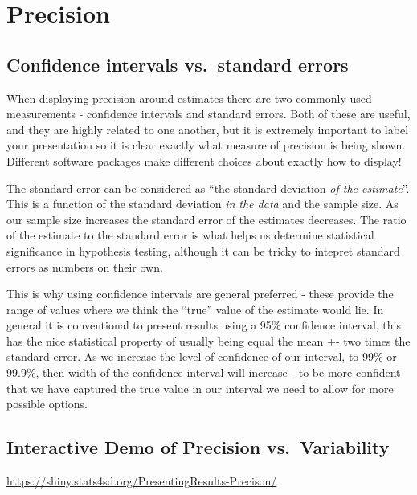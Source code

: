 \documentclass[
  titlepage]{book}
\begin{document}
\hypertarget{precision-1}{%
\section{Precision}\label{precision-1}}

\hypertarget{confidence-intervals-vs.-standard-errors}{%
\subsection{Confidence intervals vs.~standard errors}\label{confidence-intervals-vs.-standard-errors}}

When displaying precision around estimates there are two commonly used measurements - confidence intervals and standard errors. Both of these are useful, and they are highly related to one another, but it is extremely important to label your presentation so it is clear exactly what measure of precision is being shown. Different software packages make different choices about exactly how to display!

The standard error can be considered as ``the standard deviation \emph{of the estimate}''. This is a function of the standard deviation \emph{in the data} and the sample size. As our sample size increases the standard error of the estimates decreases. The ratio of the estimate to the standard error is what helps us determine statistical significance in hypothesis testing, although it can be tricky to intepret standard errors as numbers on their own.

This is why using confidence intervals are general preferred - these provide the range of values where we think the ``true'' value of the estimate would lie. In general it is conventional to present results using a 95\% confidence interval, this has the nice statistical property of usually being equal the mean +- two times the standard error. As we increase the level of confidence of our interval, to 99\% or 99.9\%, then width of the confidence interval will increase - to be more confident that we have captured the true value in our interval we need to allow for more possible options.

\hypertarget{interactive-demo-of-precision-vs.-variability}{%
\subsection{Interactive Demo of Precision vs.~Variability}\label{interactive-demo-of-precision-vs.-variability}}

\label{fig:unnamed-chunk-27}\url{https://shiny.stats4sd.org/PresentingResults-Precison/}
\end{document}
